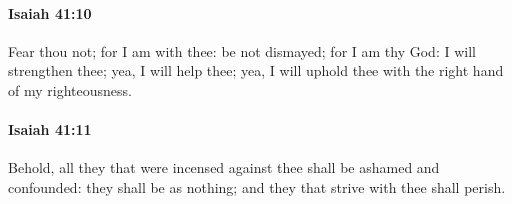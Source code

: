 		\paragraph{Isaiah 41:10} %
			\label{ISAIAH-41-10}

			Fear thou not; for I am with thee: be not dismayed; for I am thy God: I will strengthen thee; yea, I will help thee; yea, I will uphold thee with the right hand of my righteousness.


		\paragraph{Isaiah 41:11} %
			\label{ISAIAH-41-11}

			Behold, all they that were incensed against thee shall be ashamed and confounded: they shall be as nothing; and they that strive with thee shall perish.


